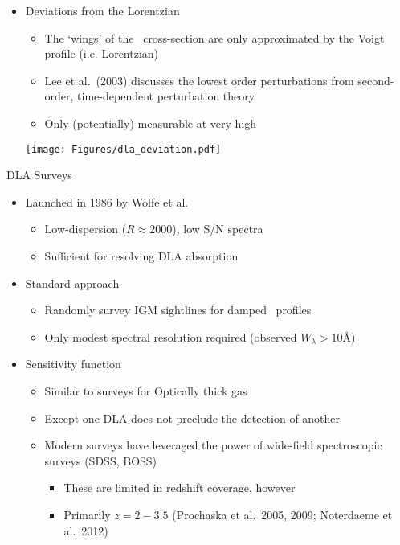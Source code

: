 \documentclass[12pt,letterpaper]{article}
\begin{document}
\begin{Aenumerate}
\begin{itemize}
    \item Deviations from the Lorentzian
      \begin{itemize}
        \item The `wings' of the \lya\ cross-section are only approximated
        by the Voigt profile (i.e. Lorentzian)
        \item Lee et al.\ (2003) discusses the lowest order perturbations
        from second-order, time-dependent perturbation theory
        \item Only (potentially) measurable at very high \nhi
      \end{itemize}

  \texttt{[image: Figures/dla\_deviation.pdf]}

  \end{itemize}

{\bf \item DLA Surveys}
  \begin{itemize}
  \item Launched in 1986 by Wolfe et al.\
    \begin{itemize}
    \item Low-dispersion ($R \approx 2000$), low S/N spectra
    \item Sufficient for resolving DLA absorption
    \end{itemize}
  \item Standard approach
    \begin{itemize}
    \item Randomly survey IGM sightlines for damped \lya\ profiles
    \item Only modest spectral resolution required (observed $W_\lambda > 10$\AA)
    \end{itemize}
  \item Sensitivity function
    \begin{itemize}
    \item Similar to surveys for Optically thick gas
    \item Except one DLA does not preclude the detection of another
    \item Modern surveys have leveraged the power of wide-field spectroscopic
    surveys (SDSS, BOSS)
      \begin{itemize}
      \item These are limited in redshift coverage, however
      \item Primarily $z=2 - 3.5$  (Prochaska et al.\ 2005, 2009; Noterdaeme et al.\ 2012)


\end{itemize}
\end{itemize}
\end{itemize}
\end{Aenumerate}
\end{document}
